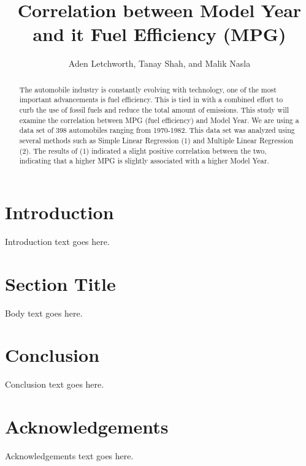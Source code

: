 \documentclass[journal]{IEEEtran}
\title{Correlation between Model Year and it Fuel Efficiency
(MPG)}
\author{Aden Letchworth, Tanay Shah, and Malik Nasla}
\begin{document}
\maketitle

\begin{abstract}
The automobile industry is constantly evolving with technology, 
one of the most important advancements is fuel efficiency. 
This is tied in with a combined effort to curb the use of fossil fuels and reduce the total amount of emissions. 
This study will examine the correlation between MPG (fuel efficiency) and Model Year. 
We are using a data set of 398 automobiles ranging from 1970-1982. 
This data set was analyzed using several methods such as Simple Linear Regression (1) and Multiple Linear Regression (2). 
The results of (1) indicated a slight positive correlation between the two, indicating that a higher MPG is slightly associated with a higher Model Year. 
\end{abstract}

\section{Introduction}
Introduction text goes here.

\section{Section Title}
Body text goes here.

\section{Conclusion}
Conclusion text goes here.

\section*{Acknowledgements}
Acknowledgements text goes here.




\end{document}
